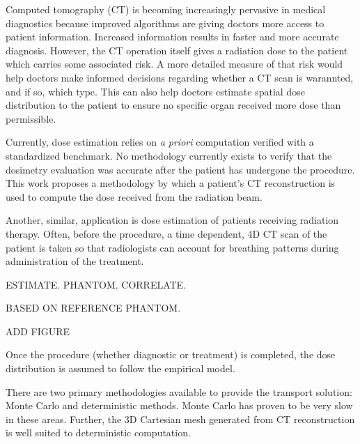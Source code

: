 

Computed tomography (CT) is becoming increasingly pervasive in medical diagnostics because improved algorithms are giving doctors more access to patient information. Increased information results in faster and more accurate diagnosis. However, the CT operation itself gives a radiation dose to the patient which carries some associated risk. A more detailed measure of that risk would help doctors make informed decisions regarding whether a CT scan is warannted, and if so, which type. This can also help doctors estimate spatial dose distribution to the patient to ensure no specific organ received more dose than permissible.

Currently, dose estimation relies on \textit{a priori} computation verified with a standardized benchmark. No methodology currently exists to verify that the dosimetry evaluation was accurate after the patient has undergone the procedure. This work proposes a methodology by which a patient's CT reconstruction is used to compute the dose received from the radiation beam.

Another, similar, application is dose estimation of patients receiving radiation therapy. Often, before the procedure, a time dependent, 4D CT scan of the patient is taken so that radiologists can account for breathing patterns during administration of the treatment. 

ESTIMATE. PHANTOM. CORRELATE.

BASED ON REFERENCE PHANTOM.

ADD FIGURE

Once the procedure (whether diagnostic or treatment) is completed, the dose distribution is assumed to follow the empirical model.

There are two primary methodologies available to provide the transport solution: Monte Carlo and deterministic methods. Monte Carlo has proven to be very slow in these areas. Further, the 3D Cartesian mesh generated from CT reconstruction is well suited to deterministic computation. 

